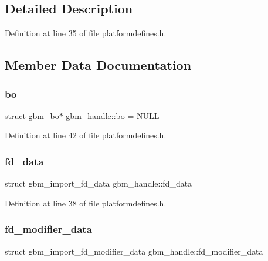 \subsection{Detailed Description}


Definition at line 35 of file platformdefines.\+h.



\subsection{Member Data Documentation}
\mbox{\label{structgbm__handle_a9010ca6ee25cee546643f6d6c5b6c4cf}} 
\subsubsection{\texorpdfstring{bo}{bo}}
{\footnotesize\ttfamily struct gbm\+\_\+bo$\ast$ gbm\+\_\+handle\+::bo = \mbox{\hyperlink{alios_2platformdefines_8h_a070d2ce7b6bb7e5c05602aa8c308d0c4}{N\+U\+LL}}}



Definition at line 42 of file platformdefines.\+h.

\mbox{\label{structgbm__handle_ae11f3776ec272cc4b10ec0625b647170}} 
\subsubsection{\texorpdfstring{fd\+\_\+data}{fd\_data}}
{\footnotesize\ttfamily struct gbm\+\_\+import\+\_\+fd\+\_\+data gbm\+\_\+handle\+::fd\+\_\+data}



Definition at line 38 of file platformdefines.\+h.

\mbox{\label{structgbm__handle_af706ddaa68480c1cf930a67d6698c1d6}} 
\subsubsection{\texorpdfstring{fd\+\_\+modifier\+\_\+data}{fd\_modifier\_data}}
{\footnotesize\ttfamily struct gbm\+\_\+import\+\_\+fd\+\_\+modifier\+\_\+data gbm\+\_\+handle\+::fd\+\_\+modifier\+\_\+data}



